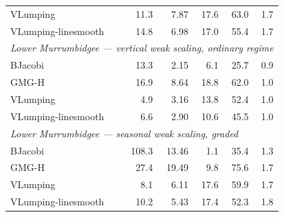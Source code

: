 \begin{table}[t]
\begin{tabular}{lrrrrr}
VLumping & 11.3 & 7.87 & 17.6 & 63.0 & 1.7 \\
VLumping-linesmooth & 14.8 & 6.98 & 17.0 & 55.4 & 1.7 \\
\hline
\multicolumn{6}{l}{\textit{Lower Murrumbidgee --- vertical weak scaling, ordinary regime}} \\
BJacobi & 13.3 & 2.15 & 6.1 & 25.7 & 0.9 \\
GMG-H & 16.9 & 8.64 & 18.8 & 62.0 & 1.0 \\
VLumping & 4.9 & 3.16 & 13.8 & 52.4 & 1.0 \\
VLumping-linesmooth & 6.6 & 2.90 & 10.6 & 45.5 & 1.0 \\
\hline
\multicolumn{6}{l}{\textit{Lower Murrumbidgee --- seasonal weak scaling, graded}} \\
BJacobi & 108.3 & 13.46 & 1.1 & 35.4 & 1.3 \\
GMG-H & 27.4 & 19.49 & 9.8 & 75.6 & 1.7 \\
VLumping & 8.1 & 6.11 & 17.6 & 59.9 & 1.7 \\
VLumping-linesmooth & 10.2 & 5.43 & 17.4 & 52.3 & 1.8 \\
\hline
\end{tabular}
\end{table}
